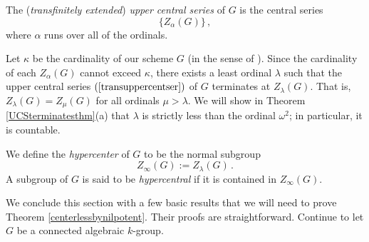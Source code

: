 \documentclass[twoside,a4paper,reqno,11pt]{amsart}
\theoremstyle{definition}
\begin{document}
\vspace{2mm}\noindent The (\textit{transfinitely extended}) \textit{upper central series} of $G$ is the central series \begin{equation}\label{transuppercentser} \{Z_\alpha(G)\}\,,\end{equation} where $\alpha$ runs over all of the ordinals. 

\vspace{2mm}\noindent Let $\kappa$ be the cardinality of our scheme $G$ (in the sense of \cite[000H]{Stacks}). Since the cardinality of each $Z_\alpha(G)$ cannot exceed $\kappa$, there exists a least ordinal $\lambda$ %
such that the upper central series $(\ref{transuppercentser})$ of $G$ terminates at $Z_\lambda(G)$. That is, $Z_\lambda(G)=Z_\mu(G)$ for all ordinals $\mu >\lambda$. We will show in Theorem \ref{UCSterminatesthm}(a) that $\lambda$ is strictly less than the ordinal $\omega^2$; in particular, it is countable.

\vspace{2mm}\noindent We define the \textit{hypercenter} of $G$ to be the normal subgroup \begin{equation}\label{hypercenterdef} Z_\infty(G):=Z_\lambda(G)\, .\end{equation} A subgroup of $G$ is said to be \textit{hypercentral} if it is contained in $Z_\infty(G)$. %

\vspace{2mm}\noindent We conclude this section with a few basic results that we will need to prove Theorem \ref{centerlessbynilpotent}. Their proofs are straightforward. Continue to let $G$ be a connected algebraic $k$-group.
\end{document}
